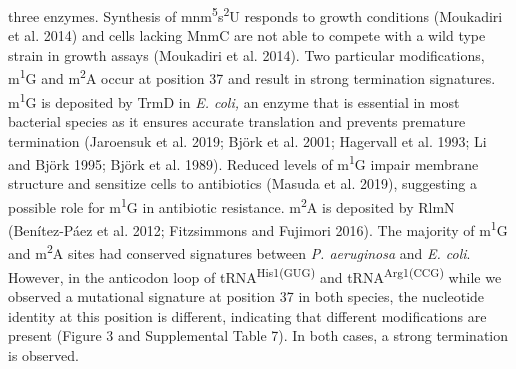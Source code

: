 \documentclass[times, twoside]{zHenriquesLab-StyleBioRxiv}
\begin{document}
three enzymes. Synthesis of mnm\textsuperscript{5}s\textsuperscript{2}U responds to growth conditions (Moukadiri et al. 2014) and cells lacking MnmC are not able to compete with a wild type strain in growth assays (Moukadiri et al. 2014). Two particular modifications, m\textsuperscript{1}G and m\textsuperscript{2}A occur at position 37 and result in strong termination signatures. m\textsuperscript{1}G is deposited by TrmD in \textit{E. coli,} an enzyme that is essential in most bacterial species as it ensures accurate translation and prevents premature termination (Jaroensuk et al. 2019; Björk et al. 2001; Hagervall et al. 1993; Li and Björk 1995; Björk et al. 1989). Reduced levels of m\textsuperscript{1}G impair membrane structure and sensitize cells to antibiotics (Masuda et al. 2019), suggesting a possible role for m\textsuperscript{1}G in antibiotic resistance. m\textsuperscript{2}A is deposited by RlmN (Benítez-Páez et al. 2012; Fitzsimmons and Fujimori 2016). The majority of m\textsuperscript{1}G and m\textsuperscript{2}A sites had conserved signatures between \textit{P. aeruginosa} and \textit{E. coli}. However, in the anticodon loop of tRNA\textsuperscript{His1(GUG)} and tRNA\textsuperscript{Arg1(CCG)} while we observed a mutational signature at position 37 in both species, the nucleotide identity at this position is different, indicating that different modifications are present (Figure 3 and Supplemental Table 7). In both cases, a strong termination is observed. 
\end{document}
